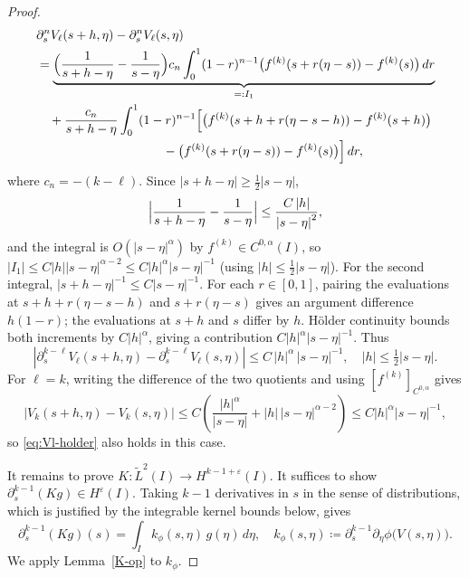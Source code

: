 \documentclass[11pt,reqno]{amsart}
\theoremstyle{plain}
\theoremstyle{definition}
\numberwithin{equation}{section}
\newcommand{\p}{\partial}
\newcommand{\wt}[1]{\widetilde{#1}}
\newcommand{\abs}[1]{\left\lvert #1 \right\rvert}
\newcommand{\ci}[1]{C^{#1}(I)}
\newcommand{\hi}[1]{H^{#1}(I)}
\begin{document}
\begin{proof}
\begin{align}
    &\p_s^n V_\ell(s+h,\eta)-\p_s^n V_\ell(s,\eta)\notag\\
    &= \underbrace{\Bigl(\frac{1}{s+h-\eta}-\frac{1}{s-\eta}\Bigr)
      c_n\int_0^1(1-r)^{n-1}
      \bigl(f^{(k)}(s+r(\eta-s))-f^{(k)}(s)\bigr)\,dr}_{=: I_1}
    \notag\\
    &\quad
    +\frac{c_n}{s+h-\eta}\int_0^1(1-r)^{n-1}
    \Bigl[\bigl(f^{(k)}(s+h+r(\eta-s-h))-f^{(k)}(s+h)\bigr)\notag\\
    &\hspace{10em}
    -\bigl(f^{(k)}(s+r(\eta-s))-f^{(k)}(s)\bigr)\Bigr]\,dr,
    \label{eq:Vl-split}
\end{align}
where $c_n=-(k-\ell)$. Since $\abs{s+h-\eta}\ge\tfrac{1}{2}\abs{s-\eta}$,
\begin{equation}
    \Bigl\lvert\frac{1}{s+h-\eta}-\frac{1}{s-\eta}\Bigr\rvert
    \le \frac{C\abs{h}}{\abs{s-\eta}^2},
\end{equation}
and the integral is $O(\abs{s-\eta}^\alpha)$ by $f^{(k)}\in\ci{0,\alpha}$, so
$\abs{I_1}\le C\abs{h}\abs{s-\eta}^{\alpha-2}
\le C\abs{h}^\alpha\abs{s-\eta}^{-1}$
(using $\abs{h}\le\tfrac{1}{2}\abs{s-\eta}$).
For the second integral, $\abs{s+h-\eta}^{-1}\le C\abs{s-\eta}^{-1}$.
For each $r\in[0,1]$, pairing the evaluations at $s+h+r(\eta-s-h)$ and
$s+r(\eta-s)$ gives an argument difference $h(1-r)$; the evaluations at $s+h$ and $s$
differ by $h$. H\"older continuity bounds both increments by
$C\abs{h}^\alpha$, giving a contribution
$C\abs{h}^\alpha\abs{s-\eta}^{-1}$. Thus
\begin{equation}\label{eq:Vl-holder}
    \abs{\p_s^{k-\ell}V_\ell(s+h,\eta)-\p_s^{k-\ell}V_\ell(s,\eta)}
    \le C\,\abs{h}^\alpha\,\abs{s-\eta}^{-1},
    \quad \abs{h}\le\tfrac{1}{2}\abs{s-\eta}.
\end{equation}
For $\ell=k$, writing the difference of the two quotients and using
$[f^{(k)}]_{C^{0,\alpha}}$ gives
\begin{equation}
    \abs{V_k(s+h,\eta)-V_k(s,\eta)}
    \le C\left(
        \frac{\abs h^\alpha}{\abs{s-\eta}}
        +\abs h\,\abs{s-\eta}^{\alpha-2}
    \right)
    \le C\abs h^\alpha\abs{s-\eta}^{-1},
\end{equation}
so \eqref{eq:Vl-holder} also holds in this case.

It remains to prove $K:\wt L^2(I)\to\hi{k-1+\varepsilon}$. It suffices
to show $\p_s^{k-1}(K g)\in\hi{\varepsilon}$.
Taking $k-1$ derivatives in $s$ in the sense of distributions, which is
justified by the integrable kernel bounds below, gives
\begin{equation}\label{eq:diff-under}
    \p_s^{k-1}(K g)(s)
    = \int_I k_\phi(s,\eta)\,g(\eta)\,d\eta,
    \quad
    k_\phi(s,\eta)\coloneqq \p_s^{k-1}\p_\eta\phi\bigl(V(s,\eta)\bigr).
\end{equation}
We apply Lemma~\ref{K-op} to $k_\phi$.


\end{proof}
\end{document}

